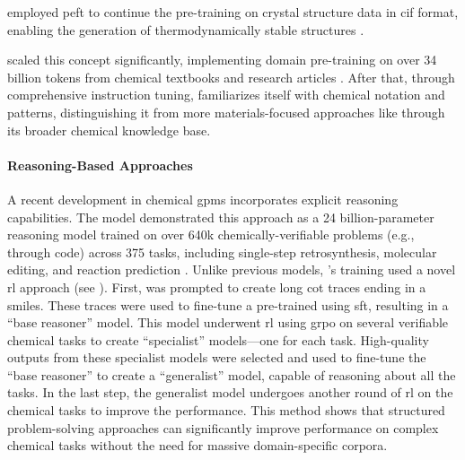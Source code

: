  employed \gls{peft} to continue the pre-training on crystal structure data in \gls{cif} format, enabling the generation of thermodynamically stable structures \autocite{mishra2024foundational}.

 scaled this concept significantly, implementing domain pre-training on over 34 billion tokens from chemical textbooks and research articles \autocite{zhao2024chemdfm}. After that, through comprehensive instruction tuning,  familiarizes itself with chemical notation and patterns, distinguishing it from more materials-focused approaches like  through its broader chemical knowledge base.

\paragraph{Reasoning-Based Approaches} A recent development in chemical \glspl{gpm} incorporates explicit reasoning capabilities. The  model demonstrated this approach as a 24 billion-parameter reasoning model trained on over 640k chemically-verifiable problems (e.g., through code) across 375 tasks, including single-step retrosynthesis, molecular editing, and reaction prediction \autocite{narayanan2025training}. 
Unlike previous models, 's training used a novel \gls{rl} approach (see ). First,  was prompted to create long \gls{cot} traces ending in a \gls{smiles}. These traces were used to fine-tune a pre-trained  using \gls{sft}, resulting in a \enquote{base reasoner} model. This model underwent \gls{rl} using \gls{grpo} on several verifiable chemical tasks to create \enquote{specialist} models---one for each task. High-quality outputs from these specialist models were selected and used to fine-tune the \enquote{base reasoner} to create a \enquote{generalist} model, capable of reasoning about all the tasks. In the last step, the generalist model undergoes another round of \gls{rl} on the chemical tasks to improve the performance. This method shows that structured problem-solving approaches can significantly improve performance on complex chemical tasks without the need for massive domain-specific corpora. 

